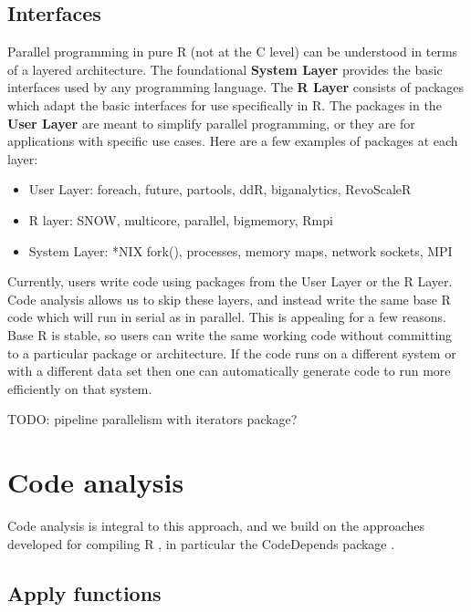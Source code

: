 \documentclass[12pt]{article}
\begin{document}
\subsection{Interfaces}

Parallel programming in pure R (not at the C level) can be understood in
terms of a layered architecture. The foundational \textbf{System Layer}
provides the basic interfaces used by any programming language. The
\textbf{R Layer} consists of packages which adapt the basic interfaces for
use specifically in R. The packages in the \textbf{User Layer} are meant to
simplify parallel programming, or they are for applications with specific
use cases.  Here are a few examples of packages at each layer:

\begin{itemize}
\item User Layer: foreach, future, partools, ddR, biganalytics, RevoScaleR
\item R layer: SNOW, multicore, parallel, bigmemory, Rmpi
\item System Layer: *NIX fork(), processes, memory maps, network sockets,
    MPI
\end{itemize}

Currently, users write code using packages from the User Layer or the R
Layer. Code analysis allows us to skip these layers, and instead write the
same base R code which will run in serial as in parallel.  This is
appealing for a few reasons. Base R is stable, so users can write the same
working code without committing to a particular package or architecture. If
the code runs on a different system or with a different data set then one
can automatically generate code to run more efficiently on that system.

TODO: pipeline parallelism with iterators package?

\section{Code analysis}

Code analysis is integral to this approach, and we build on the approaches
developed for compiling R \cite{lang2014enhancing}, in particular the
CodeDepends package \cite{R-CodeDepends}.

\subsection{Apply functions}
\end{document}
